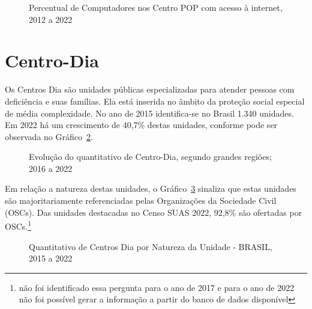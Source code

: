 \documentclass[
  letterpaper,
  DIV=11,
  numbers=noendperiod]{scrreprt}
\begin{document}
\begin{figure}


\caption{\label{fig-cpop-internet-percentual}Percentual de Computadores
nos Centro POP com acesso à internet, 2012 a 2022}

\end{figure}%

\section{Centro-Dia}\label{centro-dia}

Os Centros Dia são unidades públicas especializadas para atender pessoas
com deficiência e suas famílias. Ela está inserida no âmbito da proteção
social especial de média complexidade. No ano de 2015 identifica-se no
Brasil 1.340 unidades. Em 2022 há um crescimento de 40,7\% destas
unidades, conforme pode ser observada no
Gráfico~\ref{fig-quantitativo-Centrodia}.

\begin{figure}


\caption{\label{fig-quantitativo-Centrodia}Evolução do quantitativo de
Centro-Dia, segundo grandes regiões; 2016 a 2022}

\end{figure}%

Em relação a natureza destas unidades, o Gráfico~\ref{fig-cdia-natureza}
sinaliza que estas unidades são majoritariamente referenciadas pelas
Organizações da Sociedade Civil (OSCs). Das unidades destacadas no Censo
SUAS 2022, 92,8\% são ofertadas por OSCs.\footnote{não foi identificado
  essa pergunta para o ano de 2017 e para o ano de 2022 não foi possível
  gerar a informação a partir do banco de dados disponível}

\begin{figure}


\caption{\label{fig-cdia-natureza}Quantitativo de Centros Dia por
Natureza da Unidade - BRASIL, 2015 a 2022}

\end{figure}%
\end{document}
